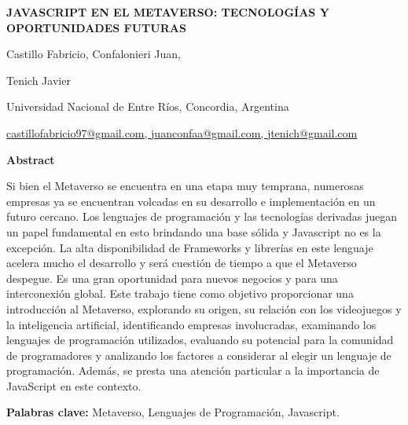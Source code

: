 \documentclass[a4paper,10pt]{article}
\begin{document}
		\pagestyle{empty}
			\centering
			\vspace*{1.5cm}
			{\fontsize{14}{17}\bfseries JAVASCRIPT EN EL METAVERSO: TECNOLOGÍAS Y OPORTUNIDADES FUTURAS\par}
			{\small Castillo Fabricio,}
			{\small Confalonieri Juan,}
			{\small Tenich Javier\par}
			{\small Universidad Nacional de Entre Ríos, Concordia, Argentina \par}
			{\normalsize \href {mailto:castillofabricio97@gmail.com}{castillofabricio97@gmail.com, }\href{mailto:juanconfaa@gmail.com}{juanconfaa@gmail.com, }
			\href{mailto:jtenich@gmail.com}{jtenich@gmail.com}}\par
			\justifying
			\textbf{Abstract}\par
			{\normalsize {Si bien el Metaverso se encuentra en una etapa muy temprana, numerosas empresas ya se encuentran volcadas en su desarrollo e implementación en un futuro cercano. Los lenguajes de programación y las tecnologías derivadas juegan un papel fundamental en esto brindando una base sólida y Javascript no es la excepción. La alta disponibilidad de Frameworks y librerías en este lenguaje acelera mucho el desarrollo y será cuestión de tiempo a que el Metaverso despegue. Es una gran oportunidad para nuevos negocios y para una interconexión global. Este trabajo tiene como objetivo proporcionar una introducción al Metaverso, explorando su origen, su relación con los videojuegos y la inteligencia artificial, identificando empresas involucradas, examinando los lenguajes de programación utilizados, evaluando su potencial para la comunidad de programadores y analizando los factores a considerar al elegir un lenguaje de programación. Además, se presta una atención particular a la importancia de JavaScript en este contexto.}}\par
		{\small \textbf{Palabras clave:} Metaverso, Lenguajes de Programación, Javascript.\par}
\end{document}
